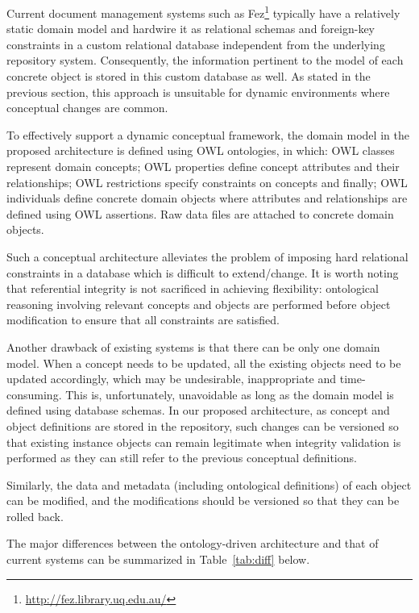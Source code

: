 \documentclass{elsarticle}
\begin{document}
Current document management systems such as
Fez\footnote{\url{http://fez.library.uq.edu.au/}} typically have a
relatively static domain model and hardwire it as relational schemas
and foreign-key constraints in a custom relational database
independent from the underlying repository system. Consequently, the
information pertinent to the model of each concrete object is stored
in this custom database as well. As stated in the previous section,
this approach is unsuitable for dynamic environments where
conceptual changes are common.

To effectively support a dynamic conceptual framework, the domain
model in the proposed architecture is defined using OWL ontologies,
in which: OWL classes represent domain concepts; OWL properties
define concept attributes and their relationships; OWL restrictions
specify constraints on concepts and finally; OWL individuals define
concrete domain objects where attributes and relationships are
defined using OWL assertions. Raw data files are attached to
concrete domain objects.

Such a conceptual architecture alleviates the problem of imposing hard
relational constraints in a database which is difficult to extend/change.
It is worth noting that referential integrity is not sacrificed in achieving
flexibility: ontological reasoning involving relevant concepts and objects
are performed before object modification to ensure that all constraints
are satisfied.

Another drawback of existing systems is that there can be only one
domain model. When a concept needs to be updated, all the existing
objects need to be updated accordingly, which may be undesirable,
inappropriate and time-consuming. This is, unfortunately, unavoidable
as long as the domain model is defined using database schemas. In our
proposed architecture,
as concept and object definitions are stored in the repository,
such changes can be versioned so that existing instance objects
can remain legitimate when integrity validation is performed as they
can still refer to the previous conceptual definitions.

Similarly, the data and metadata (including ontological definitions)
of each object can be modified, and the modifications should be
versioned so that they can be rolled back.

The major differences between the ontology-driven architecture
and that of current systems can be summarized in Table~\ref{tab:diff} below.
\end{document}
